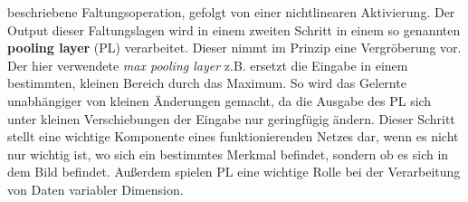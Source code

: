 beschriebene Faltungsoperation, gefolgt von einer nichtlinearen Aktivierung.
Der Output dieser Faltungslagen wird in einem zweiten Schritt in einem so
genannten \textbf{pooling layer} (PL) verarbeitet. Dieser nimmt im Prinzip eine
Vergröberung vor. Der hier verwendete \textit{max pooling layer} z.B. ersetzt
die Eingabe in einem bestimmten, kleinen Bereich durch das Maximum. So wird das
Gelernte unabhängiger von kleinen Änderungen gemacht, da die Ausgabe des PL sich
unter kleinen Verschiebungen der Eingabe nur geringfügig ändern. Dieser Schritt
stellt eine wichtige Komponente eines funktionierenden Netzes dar, wenn es
nicht nur wichtig ist, wo sich ein bestimmtes Merkmal befindet, sondern
ob es sich in dem Bild befindet.
Außerdem spielen PL eine wichtige Rolle bei der Verarbeitung von Daten
variabler Dimension.
